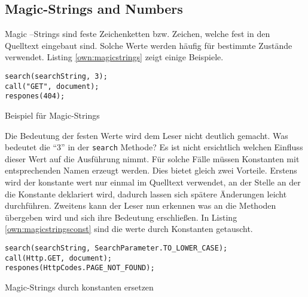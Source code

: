 \subsection{Magic-Strings and Numbers}
Magic –Strings sind feste Zeichenketten bzw. Zeichen, welche fest in den Quelltext eingebaut sind. Solche Werte werden häufig für bestimmte Zustände verwendet. Listing \ref{own:magicstrings} zeigt einige Beispiele.

\begin{listing}[H]
    \begin{verbatim}
search(searchString, 3);        
call("GET", document);
respones(404);
    \end{verbatim}
    \caption{Beispiel für Magic-Strings}
    \label{own:magicstrings}
\end{listing}


Die Bedeutung der festen Werte wird dem Leser nicht deutlich gemacht. Was bedeutet die \enquote{3} in der \texttt{search} Methode? Es ist nicht ersichtlich welchen Einfluss dieser Wert auf die Ausführung nimmt. Für solche Fälle müssen Konstanten mit entsprechenden Namen erzeugt werden. Dies bietet gleich zwei Vorteile. Erstens wird der konstante wert nur einmal im Quelltext verwendet, an der Stelle an der die Konstante deklariert wird, dadurch lassen sich spätere Änderungen leicht durchführen. Zweitens kann der Leser nun erkennen was an die Methoden übergeben wird und sich ihre Bedeutung erschließen. In Listing \ref{own:magicstringsconst} sind die werte durch Konstanten getauscht.

\begin{listing}[H]
    \begin{verbatim}
search(searchString, SearchParameter.TO_LOWER_CASE);
call(Http.GET, document);
respones(HttpCodes.PAGE_NOT_FOUND);
    \end{verbatim}
    \caption{Magic-Strings durch konstanten ersetzen}
    \label{own:magicstringsconst}
\end{listing}




